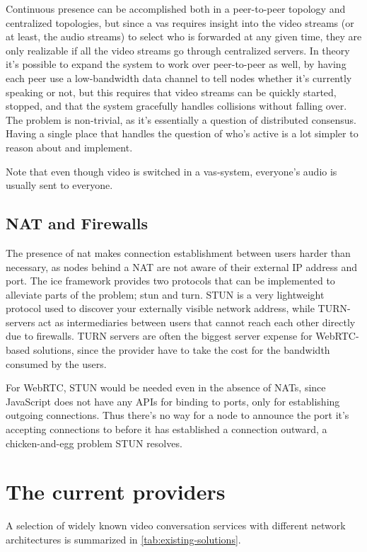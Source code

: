 Continuous presence can be accomplished both in a peer-to-peer topology and centralized topologies, but since a \gls{vas} requires insight into the video streams (or at least, the audio streams) to select who is forwarded at any given time, they are only realizable if all the video streams go through centralized servers. In theory it's possible to expand the system to work over peer-to-peer as well, by having each peer use a low-bandwidth data channel to tell nodes whether it's currently speaking or not, but this requires that video streams can be quickly started, stopped, and that the system gracefully handles collisions without falling over. The problem is non-trivial, as it's essentially a question of distributed consensus. Having a single place that handles the question of who's active is a lot simpler to reason about and implement.

Note that even though video is switched in a \gls{vas}-system, everyone's audio is usually sent to everyone.

\subsection{NAT and Firewalls}

The presence of \gls{nat} makes connection establishment between users harder than necessary, as nodes behind a NAT are not aware of their external IP address and port. The \gls{ice} framework provides two protocols that can be implemented to alleviate parts of the problem; \gls{stun} and \gls{turn}. STUN is a very lightweight protocol used to discover your externally visible network address, while TURN-servers act as intermediaries between users that cannot reach each other directly due to firewalls. TURN servers are often the biggest server expense for WebRTC-based solutions, since the provider have to take the cost for the bandwidth consumed by the users.

For WebRTC, STUN would be needed even in the absence of NATs, since JavaScript does not have any APIs for binding to ports, only for establishing outgoing connections. Thus there's no way for a node to announce the port it's accepting connections to before it has established a connection outward, a chicken-and-egg problem STUN resolves.


\section{The current providers}

A selection of widely known video conversation services with different network architectures is summarized in \autoref{tab:existing-solutions}.

